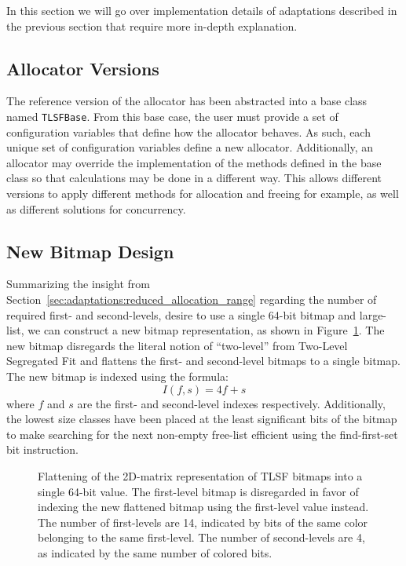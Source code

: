
In this section we will go over implementation details of adaptations described in the previous section that require more in-depth explanation.

\subsection{Allocator Versions}

The reference version of the allocator has been abstracted into a base class named \texttt{TLSFBase}. From this base case, the user must provide a set of configuration variables that define how the allocator behaves. As such, each unique set of configuration variables define a new allocator. Additionally, an allocator may override the implementation of the methods defined in the base class so that calculations may be done in a different way. This allows different versions to apply different methods for allocation and freeing for example, as well as different solutions for concurrency.

\subsection{New Bitmap Design}

Summarizing the insight from Section~\ref{sec:adaptations:reduced_allocation_range} regarding the number of required first- and second-levels, desire to use a single 64-bit bitmap and large-list, we can construct a new bitmap representation, as shown in Figure~\ref{fig:bitmap_flattening}. The new bitmap disregards the literal notion of ``two-level'' from Two-Level Segregated Fit and flattens the first- and second-level bitmaps to a single bitmap. The new bitmap is indexed using the formula:
\[
    I(f, s) = 4f + s
\]
where $f$ and $s$ are the first- and second-level indexes respectively. Additionally, the lowest size classes have been placed at the least significant bits of the bitmap to make searching for the next non-empty free-list efficient using the find-first-set bit instruction.

\begin{figure}[H]
    \centering
    
    \vspace*{4mm}
    \caption{Flattening of the 2D-matrix representation of TLSF bitmaps into a single 64-bit value. The first-level bitmap is disregarded in favor of indexing the new flattened bitmap using the first-level value instead. The number of first-levels are 14, indicated by bits of the same color belonging to the same first-level. The number of second-levels are 4, as indicated by the same number of colored bits.}
    \label{fig:bitmap_flattening}
\end{figure}


